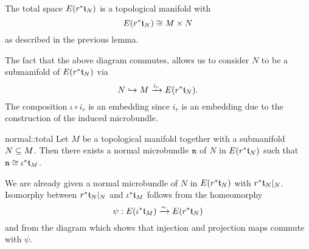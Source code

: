 \begin{myparagraph}
    The total space $E(r^*\mathfrak{t}_N)$ is a topological manifold with
    \[ E(r^*\mathfrak{t}_N) \cong M \times N \]
    as described in the previous lemma.

    The fact that the above diagram commutes,
    allows us to consider $N$ to be a submanifold of $E(r^*\mathfrak{t}_N)$ via
    \[ N \hookrightarrow{} M \xrightarrow{i_r} E(r^*\mathfrak{t}_N). \]
    The composition $\iota \circ i_r$ is an embedding since $i_r$ is an embedding
    due to the construction of the induced microbundle.
\end{myparagraph}

\begin{mylemma}{normal::total}
    Let $M$ be a topological manifold together with a submanifold $N \subseteq{} M$.
    Then there exists a normal microbundle $\mathfrak{n}$ of $N$ in $E(r^*\mathfrak{t}_N)$ such that $\mathfrak{n} \cong \iota^*\mathfrak{t}_M$.
\end{mylemma}

\begin{myproof}
    We are already given a normal microbundle of $N$ in $E(r^*\mathfrak{t}_N)$ with $r^*\mathfrak{t}_N\vert_{N}$.
    Isomorphy between $r^*\mathfrak{t}_N\vert_{N}$ and $\iota^*\mathfrak{t}_M$ follows from the homeomorphy
    \[ \psi: E(\iota^*\mathfrak{t}_M) \xrightarrow{\sim} E(r^*\mathfrak{t}_N) \]
    and from the diagram which shows that injection and projection maps commute with $\psi$.
\end{myproof}